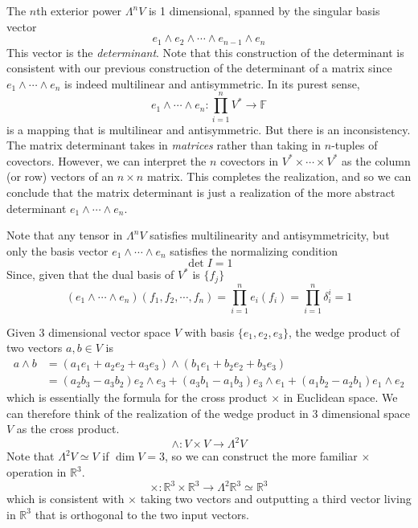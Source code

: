   \begin{definition}
    The $n$th exterior power $\Lambda^n V$ is 1 dimensional, spanned by the singular basis vector 
    \[e_1 \wedge e_2 \wedge \cdots \wedge e_{n-1} \wedge e_n\]
    This vector is the \textit{determinant}. Note that this construction of the determinant is consistent with our previous construction of the determinant of a matrix since $e_1 \wedge \cdots \wedge e_n$ is indeed multilinear and antisymmetric. In its purest sense, 
    \[e_1 \wedge \cdots \wedge e_n: \prod_{i=1}^n V^* \longrightarrow \mathbb{F}\]
    is a mapping that is multilinear and antisymmetric. But there is an inconsistency. The matrix determinant takes in \textit{matrices} rather than taking in $n$-tuples of covectors. However, we can interpret the $n$ covectors in $V^* \times \cdots \times V^*$ as the column (or row) vectors of an $n \times n$ matrix. This completes the realization, and so we can conclude that the matrix determinant is just a realization of the more abstract determinant $e_1 \wedge \cdots \wedge e_n$. 

    Note that any tensor in $\Lambda^n V$ satisfies multilinearity and antisymmetricity, but only the basis vector $e_1 \wedge \cdots \wedge e_n$ satisfies the normalizing condition
    \[\det{I} = 1\]
    Since, given that the dual basis of $V^*$ is $\{f_j\}$
    \[(e_1 \wedge \cdots \wedge e_n) (f_1, f_2, \cdots, f_n) = \prod_{i=1}^n e_i (f_i) = \prod_{i=1}^n \delta_i^i = 1\]
  \end{definition}

  \begin{example}
    Given 3 dimensional vector space $V$ with basis $\{e_1, e_2, e_3\}$, the wedge product of two vectors $a, b \in V$ is 
    \begin{align*}
      a \wedge b & = (a_1 e_1 + a_2 e_2 + a_3 e_3) \wedge (b_1 e_1 + b_2 e_2 + b_3 e_3) \\
      & = (a_2 b_3 - a_3 b_2) e_2 \wedge e_3 + (a_3 b_1 - a_1 b_3) e_3 \wedge e_1 + (a_1 b_2 - a_2 b_1) e_1 \wedge e_2 
    \end{align*}
    which is essentially the formula for the cross product $\times$ in Euclidean space. We can therefore think of the realization of the wedge product in 3 dimensional space $V$ as the cross product. 
    \[\wedge: V \times V \longrightarrow \Lambda^2 V\]
    Note that $\Lambda^2 V \simeq V$ if $\dim{V} = 3$, so we can construct the more familiar $\times$ operation in $\mathbb{R}^3$. 
    \[\times: \mathbb{R}^3 \times \mathbb{R}^3 \longrightarrow \Lambda^2 \mathbb{R}^3 \simeq \mathbb{R}^3\]
    which is consistent with $\times$ taking two vectors and outputting a third vector living in $\mathbb{R}^3$ that is orthogonal to the two input vectors. 
  \end{example}

